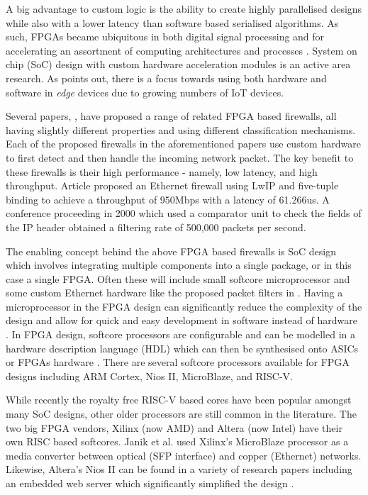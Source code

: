 A big advantage to custom logic is the ability to create highly parallelised designs while also with a lower latency than software based serialised algorithms. 
As such, FPGAs became ubiquitous in both digital signal processing and for accelerating an assortment of computing architectures and processes \cite{FPGAComputing}.
System on chip (SoC) design with custom hardware acceleration modules is an active area research. As \cite{FPGAComputing} points out, there is a focus towards 
using both hardware and software in \textit{edge} devices due to growing numbers of IoT devices.

Several papers, \cite{LwIPFPGAFirewall} \cite{IPFPGAFirewall2000} \cite{packetFilteringFPGA}, have proposed a range of related FPGA based firewalls, all having 
slightly different properties and using different classification mechanisms. Each of the proposed firewalls in the aforementioned papers use custom hardware 
to first detect and then handle the incoming network packet. The key benefit to these firewalls is their high 
performance - namely, low latency, and high throughput. Article \cite{LwIPFPGAFirewall} proposed an Ethernet firewall using LwIP and five-tuple binding 
to achieve a throughput of 950Mbps with a latency of 61.266us. A conference proceeding in 2000 \cite{IPFPGAFirewall2000} which used a comparator unit to check the 
fields of the IP header obtained a filtering rate of 500,000 packets per second. 

The enabling concept behind the above FPGA based firewalls is SoC design which involves integrating multiple components into a single package, or in this case a 
single FPGA. Often these will include small softcore microprocessor and some custom Ethernet hardware like the proposed packet filters in \cite{LwIPFPGAFirewall}.
Having a microprocessor in the FPGA design can significantly reduce the complexity of the design and allow for quick and easy development in software instead of 
hardware \cite{SoftcoreBasedEmbeddedSystems}. In FPGA design, softcore processors are configurable and can be modelled in a hardware description language (HDL) 
which can then be synthesised onto ASICs or FPGAs hardware \cite{SoftcoreBasedEmbeddedSystems}. There are several softcore processors available for FPGA 
designs including ARM Cortex, Nios II, MicroBlaze, and RISC-V. 
 
While recently the royalty free RISC-V based cores have been popular amongst many SoC designs, other older processors are still common in the literature. The two 
big FPGA vendors, Xilinx (now AMD) and Altera (now Intel) have their own RISC based softcores. Janik et al. \cite{LwIPMicroblaze} used Xilinx's MicroBlaze processor 
as a media converter between optical (SFP interface) and copper (Ethernet) networks. Likewise, Altera's Nios II can be found in a variety of research papers 
including an embedded web server which significantly simplified the design \cite{NiosIIWebserver}. 












